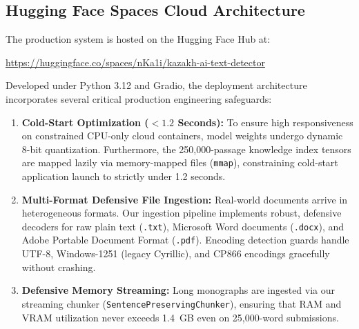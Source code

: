 \subsection{Hugging Face Spaces Cloud Architecture}
The production system is hosted on the Hugging Face Hub at:
\begin{center}
    \url{https://huggingface.co/spaces/nKa1i/kazakh-ai-text-detector}
\end{center}
Developed under Python 3.12 and Gradio, the deployment architecture incorporates several critical production engineering safeguards:
\begin{enumerate}
    \item \textbf{Cold-Start Optimization ($<1.2$ Seconds):} To ensure high responsiveness on constrained CPU-only cloud containers, model weights undergo dynamic 8-bit quantization. Furthermore, the 250,000-passage knowledge index tensors are mapped lazily via memory-mapped files (\texttt{mmap}), constraining cold-start application launch to strictly under 1.2 seconds.
    \item \textbf{Multi-Format Defensive File Ingestion:} Real-world documents arrive in heterogeneous formats. Our ingestion pipeline implements robust, defensive decoders for raw plain text (\texttt{.txt}), Microsoft Word documents (\texttt{.docx}), and Adobe Portable Document Format (\texttt{.pdf}). Encoding detection guards handle UTF-8, Windows-1251 (legacy Cyrillic), and CP866 encodings gracefully without crashing.
    \item \textbf{Defensive Memory Streaming:} Long monographs are ingested via our streaming chunker (\texttt{SentencePreservingChunker}), ensuring that RAM and VRAM utilization never exceeds 1.4~GB even on 25,000-word submissions.
\end{enumerate}

